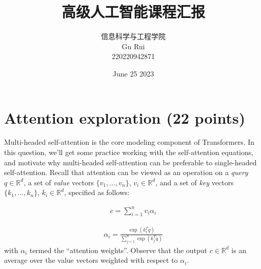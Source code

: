 \documentclass[letterpaper,12pt]{article}
\begin{document}
	
	
	\title{\songti {}高级人工智能课程汇报}
	\author{信息科学与工程学院 \\ \textrm{Gu Rui} \\ 220220942871}
	\date{\textrm{June 25  2023}}
	\maketitle
	
	\renewcommand{\figurename}{Figure} %
	\renewcommand{\contentsname}{Contents}
	\renewcommand{\tablename}{Table}
	\tableofcontents  %
	
	\section{Attention exploration (22 points)}
	
	\noindent Multi-headed self-attention is the core modeling component of Transformers. In this question, we’ll get some practice working with the self-attention equations, and motivate why multi-headed self-attention can be preferable to single-headed self-attention.
	Recall that attention can be viewed as an operation on a \textit{query} $q \in \mathbb{R}^d$, a set of \textit{value} vectors $\{v_1, . . . , v_n \}$, $v_i \in
	\mathbb{R}^d$, and a set of \textit{key} vectors $\{k_1, . . . , k_n\}$, $k_i \in \mathbb{R}^d$, specified as follows:
	
	\begin{equation}
		\begin{aligned}
			c = \sum_{i=1}^{n} v_{i}\alpha_{i}
		\end{aligned}
		\label{eq: Attention_formula_1}
	\end{equation}
	
	\begin{equation}
		\begin{aligned}
			\alpha_{i} = \frac{\exp(k_{i}^{T}q)}{\sum_{j=1}^{n} \exp(k_{j}^{T}q)}
		\end{aligned}
		\label{eq: Attention_formula_2}
	\end{equation}
	with $α_i$ termed the “attention weights”. Observe that the output $c \in \mathbb{R}^d$
	is an average over the value vectors weighted with respect to $α_i$.
	
\end{document}

